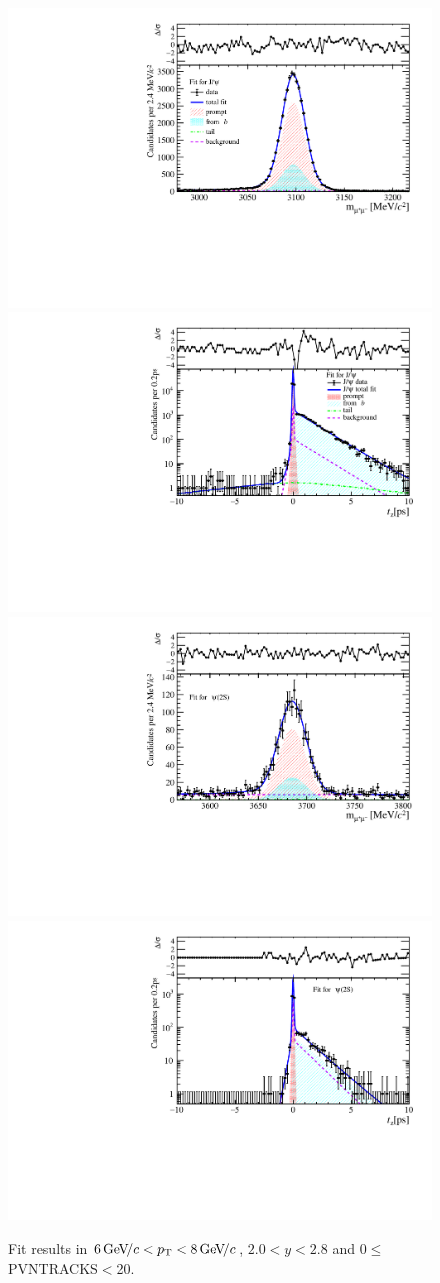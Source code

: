 \begin{figure}[H]
\begin{center}
\includegraphics[width=0.47\linewidth]{pdf/Jpsi/drawmass/n1y1pt4.pdf}
\includegraphics[width=0.47\linewidth]{pdf/Jpsi/2DFit/n1y1pt4.pdf}
\vspace*{-0.5cm}
\includegraphics[width=0.47\linewidth]{pdf/Psi2S/drawmass/n1y1pt4.pdf}
\includegraphics[width=0.47\linewidth]{pdf/Psi2S/2DFit/n1y1pt4.pdf}
\vspace*{-0.5cm}
\end{center}
\caption{Fit results in $6\text{\,Ge\kern -0.1em V\!/}c<p_{\mathrm{T}}<8\text{\,Ge\kern -0.1em V\!/}c$, $2.0<y<2.8$ and 0$\leq$PVNTRACKS$<$20.}
\label{Fitn1y1pt4}
\end{figure}
